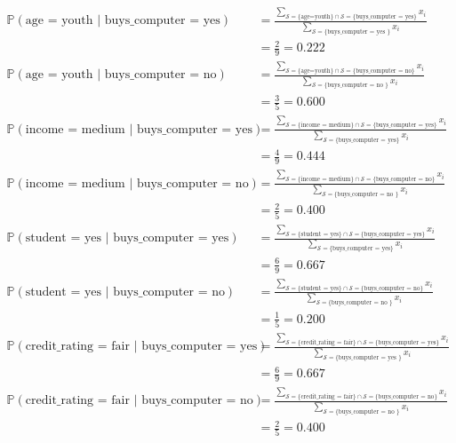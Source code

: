 \documentclass[a4paper, 13pt]{report}
\begin{document}
\[
\begin{aligned}
\mathbb{P}(\text{age = youth | buys\_computer = yes}) & =  \frac{\sum_{\mathcal{S}=\{\text{age=youth}\}\cap\mathcal{S}=\{\text{buys\_computer = yes}\}} x_i}
{\sum_{\mathcal{S}=\{\text{buys\_computer = yes }\}} x_i} \\
									&= \frac{2}{9} = 0.222\\
\mathbb{P}(\text{age = youth | buys\_computer = no}) & =  \frac{\sum_{\mathcal{S}=\{\text{age=youth}\}\cap\mathcal{S}=\{\text{buys\_computer = no}\}} x_i}
{\sum_{\mathcal{S}=\{\text{buys\_computer = no }\}} x_i} \\
									&= \frac{3}{5} = 0.600\\
\mathbb{P}(\text{income = medium | buys\_computer = yes}) & =  \frac{\sum_{\mathcal{S}=\{\text{income = medium}\}\cap\mathcal{S}=\{\text{buys\_computer = yes}\}} x_i}
{\sum_{\mathcal{S}=\{\text{buys\_computer = yes}\}} x_i} \\
&= \frac{4}{9} = 0.444\\
\mathbb{P}(\text{income = medium | buys\_computer = no}) & =  \frac{\sum_{\mathcal{S}=\{\text{income = medium}\}\cap\mathcal{S}=\{\text{buys\_computer = no}\}} x_i}
{\sum_{\mathcal{S}=\{\text{buys\_computer = no }\}} x_i} \\
&= \frac{2}{5} = 0.400\\
\mathbb{P}(\text{student = yes | buys\_computer = yes}) & =  \frac{\sum_{\mathcal{S}=\{\text{student = yes}\}\cap\mathcal{S}=\{\text{buys\_computer = yes}\}} x_i}
{\sum_{\mathcal{S}=\{\text{buys\_computer = yes}\}} x_i} \\
&= \frac{6}{9} = 0.667\\
\mathbb{P}(\text{student = yes | buys\_computer = no}) & =  \frac{\sum_{\mathcal{S}=\{\text{student = yes}\}\cap\mathcal{S}=\{\text{buys\_computer = no}\}} x_i}
{\sum_{\mathcal{S}=\{\text{buys\_computer = no }\}} x_i} \\
&= \frac{1}{5} = 0.200\\
\mathbb{P}(\text{credit\_rating = fair | buys\_computer = yes}) & =  \frac{\sum_{\mathcal{S}=\{\text{credit\_rating = fair}\}\cap\mathcal{S}=\{\text{buys\_computer = yes}\}} x_i}
{\sum_{\mathcal{S}=\{\text{buys\_computer = yes }\}} x_i} \\
&= \frac{6}{9} = 0.667\\
\mathbb{P}(\text{credit\_rating = fair | buys\_computer = no}) & =  \frac{\sum_{\mathcal{S}=\{\text{credit\_rating = fair}\}\cap\mathcal{S}=\{\text{buys\_computer = no}\}} x_i}
{\sum_{\mathcal{S}=\{\text{buys\_computer = no }\}} x_i} \\
&= \frac{2}{5} = 0.400\\
\end{aligned}
\]
\end{document}
